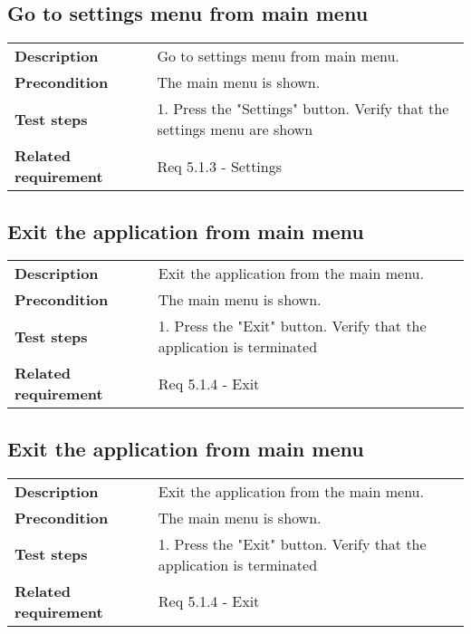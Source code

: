 \documentclass[a4paper,titlepage]{article}
\begin{document}
\subsection{Go to settings menu from main menu}
\begin{tabularx}{\textwidth}{lX}
	\textbf{Description}	&
		Go to settings menu from main menu.\\
	\textbf{Precondition}	&
		The main menu is shown.\\
	\textbf{Test steps}	&
		1. Press the "Settings" button\newline
		2. Verify that the settings menu are shown\\
	\textbf{Related requirement}	&
		Req 5.1.3 - Settings \\
\end{tabularx}

\subsection{Exit the application from main menu}
\begin{tabularx}{\textwidth}{lX}
	\textbf{Description}	&
		Exit the application from the main menu.\\
	\textbf{Precondition}	&
		The main menu is shown.\\
	\textbf{Test steps}	&
		1. Press the "Exit" button\newline
		2. Verify that the application is terminated\\
	\textbf{Related requirement}	&
		Req 5.1.4 - Exit \\
\end{tabularx}

\subsection{Exit the application from main menu}
\begin{tabularx}{\textwidth}{lX}
	\textbf{Description}	&
		Exit the application from the main menu.\\
	\textbf{Precondition}	&
		The main menu is shown.\\
	\textbf{Test steps}	&
		1. Press the "Exit" button\newline
		2. Verify that the application is terminated\\
	\textbf{Related requirement}	&
		Req 5.1.4 - Exit \\
\end{tabularx}

\end{document}

